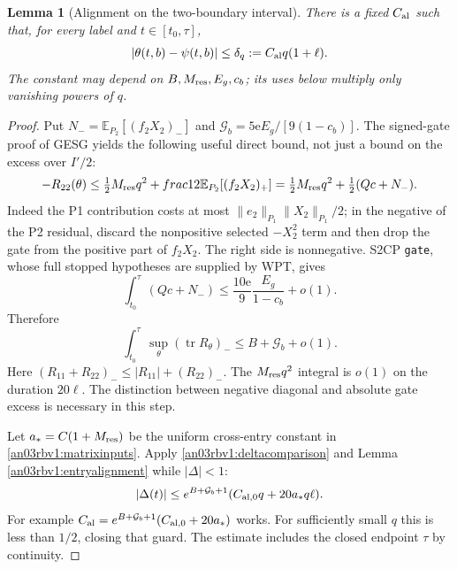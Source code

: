 \documentclass[11pt]{article}
\numberwithin{equation}{section}
\newtheorem{lemma}[theorem]{Lemma}
\theoremstyle{remark}\newtheorem{remark}[theorem]{Remark}
\newcommand{\E}{\mathbb E}
\begin{document}
\begin{lemma}[Alignment on the two-boundary interval]
\label{an03rbv1:postalignment}
There is a fixed $C_{\rm al}$ such that, for every label and
$t\in[t_0,\tau]$,
\begin{equation}
 |\theta(t,b)-\psi(t,b)|\le\delta_q:=C_{\rm al}q(1+\ell).
 \label{an03rbv1:deltapost}
\end{equation}
The constant may depend on $B,M_{\rm res},E_g,c_b$; its uses
below multiply only vanishing powers of $q$.
\end{lemma}
\begin{proof}
Put $N_-=\E_{P_2}[(f_2X_2)_-]$ and
$\mathcal G_b=5\mathrm e E_g/[9(1-c_b)]$.
The signed-gate proof of GESG yields the following useful direct
bound, not just a bound on the excess over $I'/2$:
\begin{equation}
 -R_{22}(\theta)
 \le\tfrac12M_{\rm res}q^2+	frac12\E_{P_2}[(f_2X_2)_+]
 =\tfrac12M_{\rm res}q^2+\tfrac12(Qc+N_-).
 \label{an03rbv1:negdiagonal}
\end{equation}
Indeed the P1 contribution costs at most
$\|e_2\|_{P_1}\|X_2\|_{P_1}/2$; in the negative of the P2
residual, discard the nonpositive selected $-X_2^2$ term and
then drop the gate from the positive part of $f_2X_2$.
The right side is nonnegative. S2CP \texttt{gate}, whose full
stopped hypotheses are supplied by WPT, gives
\[
 \int_{t_0}^{\tau}(Qc+N_-)
       \le\frac{10\mathrm e}{9}\frac{E_g}{1-c_b}+o(1).
\]
Therefore
\begin{equation}
 \int_{t_0}^{\tau}\sup_\theta(\operatorname{tr}R_\theta)_-
       \le B+\mathcal G_b+o(1).
 \label{an03rbv1:tracebudget}
\end{equation}
Here $(R_{11}+R_{22})_-\le|R_{11}|+(R_{22})_-$.
The $M_{\rm res}q^2$ integral is $o(1)$ on the duration $20\ell$.
The distinction between negative diagonal and absolute gate excess
is necessary in this step.

Let $a_*=C(1+M_{\rm res})$ be the uniform cross-entry constant
in \eqref{an03rbv1:matrixinputs}. Apply
\eqref{an03rbv1:deltacomparison} and Lemma
\ref{an03rbv1:entryalignment} while $|\Delta|<1$:
\[
 |\Delta(t)|\le e^{B+\mathcal G_b+1}
                 (C_{\rm al,0}q+20a_*q\ell).
\]
For example
$C_{\rm al}=e^{B+\mathcal G_b+1}(C_{\rm al,0}+20a_*)$
works. For sufficiently small $q$ this is less than $1/2$,
closing that guard. The estimate includes the closed endpoint
$\tau$ by continuity.
\end{proof}
\end{document}
